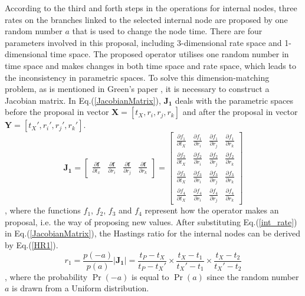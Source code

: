 \documentclass{bmcart}
\begin{document}
According to the third and forth steps in the operations for internal nodes, three rates on the branches linked to the selected internal node are proposed by one random number $a$ that is used to change the node time. There are four parameters involved in this proposal, including 3-dimensional rate space and 1-dimensional time space. The proposed operator utilises one random number in time space and makes changes in both time space and rate space, which leads to the inconsistency in parametric spaces. To solve this dimension-matching problem, as is mentioned in Green's paper \cite{green1995reversible}, it is necessary to construct a Jacobian matrix.  In Eq.(\ref{JacobianMatrix}), ${\mathbf{J_1}}$ deals with the parametric spaces before the proposal in vector ${\mathbf{X}} = [{t_X},{r_i},{r_j},{r_k}]$ and after the proposal in vector ${\mathbf{Y}} = [{t_X}',{r_i}',{r_j}',{r_k}']$.
\begin{equation}\label{JacobianMatrix}
{\mathbf{J_1}} = \left[ {\begin{array}{*{20}{c}}
  {\frac{{\partial {\mathbf{f}}}}{{\partial {t_x}}}}&{\frac{{\partial {\mathbf{f}}}}{{\partial {r_i}}}}&{\frac{{\partial {\mathbf{f}}}}{{\partial {r_j}}}}&{\frac{{\partial {\mathbf{f}}}}{{\partial {r_k}}}}
\end{array}} \right] = \left[ {\begin{array}{*{20}{c}}
  {\frac{{\partial {f_1}}}{{\partial {t_X}}}}&{\frac{{\partial {f_1}}}{{\partial {r_i}}}}&{\frac{{\partial {f_1}}}{{\partial {r_j}}}}&{\frac{{\partial {f_1}}}{{\partial {r_k}}}} \\
  {\frac{{\partial {f_2}}}{{\partial {t_X}}}}&{\frac{{\partial {f_2}}}{{\partial {r_i}}}}&{\frac{{\partial {f_2}}}{{\partial {r_j}}}}&{\frac{{\partial {f_2}}}{{\partial {r_k}}}} \\
  {\frac{{\partial {f_3}}}{{\partial {t_X}}}}&{\frac{{\partial {f_3}}}{{\partial {r_i}}}}&{\frac{{\partial {f_3}}}{{\partial {r_j}}}}&{\frac{{\partial {f_3}}}{{\partial {r_k}}}} \\
  {\frac{{\partial {f_4}}}{{\partial {t_X}}}}&{\frac{{\partial {f_4}}}{{\partial {r_i}}}}&{\frac{{\partial {f_4}}}{{\partial {r_j}}}}&{\frac{{\partial {f_4}}}{{\partial {r_k}}}}
\end{array}} \right]
\end{equation}
, where the functions ${f_1}$, ${f_2}$, ${f_3}$ and ${f_4}$ represent how the operator makes an proposal, i.e. the way of proposing new values. After substituting Eq.(\ref{int_rate}) in Eq.(\ref{JacobianMatrix}), the Hastings ratio for the internal nodes can be derived by Eq.(\ref{HR1}).
\begin{equation}\label{HR1}
{r_1} = \frac{{p ( - a)}}{{p (a)}}\left| {\mathbf{J_1}} \right| = \frac{{{t_P} - {t_X}}}{{{t_P} - {t_X}'}} \times \frac{{{t_X} - {t_1}}}{{{t_X}' - {t_1}}} \times \frac{{{t_X} - {t_2}}}{{{t_X}' - {t_2}}}
\end{equation}
, where the probability ${\Pr ( - a)}$ is equal to ${\Pr ( a )}$ since the random number $a$ is drawn from a Uniform distribution.
\end{document}
